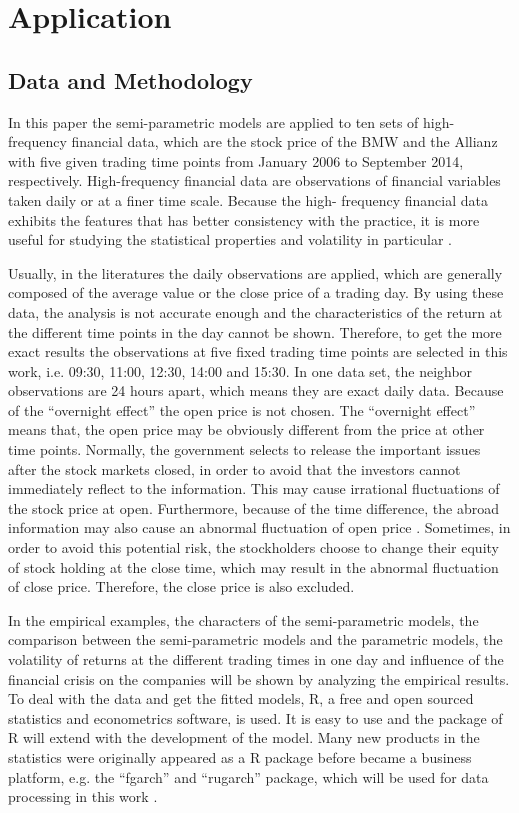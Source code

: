 \chapter{Application}


\section{Data and Methodology}

In this paper the semi-parametric models are applied to ten sets of high-frequency financial data, which are the stock price of the BMW and the Allianz with five given trading time points from January 2006 to September 2014, respectively. High-frequency financial data are observations of financial variables taken daily or at a finer time scale. Because the high- frequency financial data exhibits the features that has better consistency with the practice, it is more useful for studying the statistical properties and volatility in particular \citep{Zivot2005}.

Usually, in the literatures the daily observations are applied, which are generally composed of the average value or the close price of a trading day. By using these data, the analysis is not accurate enough and the characteristics of the return at the different time points in the day cannot be shown. Therefore, to get the more exact results the observations at five fixed trading time points are selected in this work, i.e. 09:30, 11:00, 12:30, 14:00 and 15:30. In one data set, the neighbor observations are 24 hours apart, which means they are exact daily data. Because of the “overnight effect” the open price is not chosen. The “overnight effect” means that, the open price may be obviously different from the price at other time points. Normally, the government selects to release the important issues after the stock markets closed, in order to avoid that the investors cannot immediately reflect to the information. This may cause irrational fluctuations of the stock price at open. Furthermore, because of the time difference, the abroad information may also cause an abnormal fluctuation of open price \citep{Tsai2012}. Sometimes, in order to avoid this potential risk, the stockholders choose to change their equity of stock holding at the close time, which may result in the abnormal fluctuation of close price. Therefore, the close price is also excluded.  

In the empirical examples, the characters of the semi-parametric models, the comparison between the semi-parametric models and the parametric models, the volatility of returns at the different trading times in one day and influence of the financial crisis on the companies will be shown by analyzing the empirical results. To deal with the data and get the fitted models, R, a free and open sourced statistics and econometrics software, is used. It is easy to use and the package of R will extend with the development of the model. Many new products in the statistics were originally appeared as a R package before became a business platform, e.g. the “fgarch” and “rugarch” package, which will be used for data processing in this work \citep{Consulting2013}.


